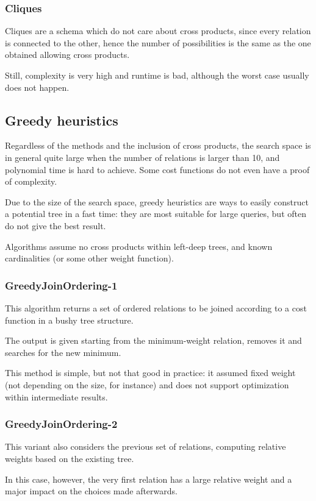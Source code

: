 \subsubsection{Cliques}
Cliques are a schema which do not care about cross products, since every relation is connected to the other, hence the number of possibilities is the same as the one obtained allowing cross products. 

Still, complexity is very high and runtime is bad, although the worst case usually does not happen. 

\subsection{Greedy heuristics}
Regardless of the methods and the inclusion of cross products, the search space is in general quite large when the number of relations is larger than 10, and polynomial time is hard to achieve. Some cost functions do not even have a proof of complexity.

Due to the size of the search space, greedy heuristics are ways to easily construct a potential tree in a fast time: they are most suitable for large queries, but often do not give the best result.

Algorithms assume no cross products within left-deep trees, and known cardinalities (or some other weight function).

\subsubsection{GreedyJoinOrdering-1}
This algorithm returns a set of ordered relations to be joined according to a cost function in a bushy tree structure. 

The output is given starting from the minimum-weight relation, removes it and searches for the new minimum. 

This method is simple, but not that good in practice: it assumed fixed weight (not depending on the size, for instance) and does not support optimization within intermediate results. 

\subsubsection{GreedyJoinOrdering-2}
This variant also considers the previous set of relations, computing relative weights based on the existing tree. 

In this case, however, the very first relation has a large relative weight and a major impact on the choices made afterwards. 

